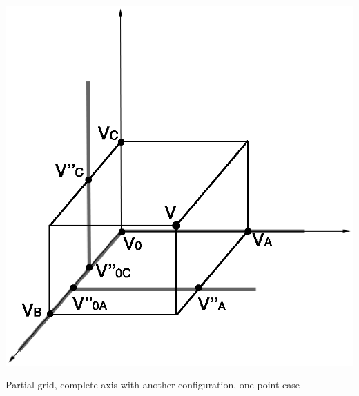 \begin{multicols}{2}
{\begin{figurehere}
\begin{center}
\includegraphics[scale=0.40]{Interpolation-AXE-INSbis.eps}
\caption{Partial grid, complete axis with another configuration, one point case}
\label{figNCRAXEINSbis}
\end{center}
\end{figurehere}

}
\end{multicols}
